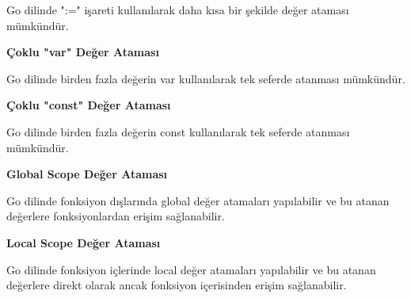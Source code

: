 Go dilinde ":=" işareti kullanılarak daha kısa bir şekilde değer ataması mümkündür. 
\vspace{5mm}




\vspace{8mm}
\textbf{Çoklu "var" Değer Ataması}
\vspace{7mm}

Go dilinde birden fazla değerin var kullanılarak tek seferde atanması mümkündür.
\vspace{5mm}



\vspace{10mm}
\textbf{Çoklu "const" Değer Ataması}
\vspace{7mm}

Go dilinde birden fazla değerin const kullanılarak tek seferde atanması mümkündür.
\vspace{5mm}



\vspace{20mm}
\textbf{Global Scope Değer Ataması}
\vspace{7mm}

Go dilinde fonksiyon dışlarında global değer atamaları yapılabilir ve bu atanan değerlere fonksiyonlardan erişim sağlanabilir.
\vspace{10mm}



\vspace{10mm}
\textbf{Local Scope Değer Ataması}
\vspace{5mm}

Go dilinde fonksiyon içlerinde local değer atamaları yapılabilir ve bu atanan değerlere direkt olarak ancak fonksiyon içerisinden erişim sağlanabilir.
\vspace{5mm}




